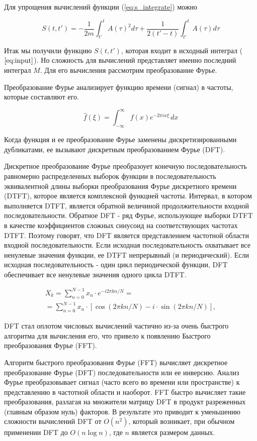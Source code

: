 \documentclass[14pt]{extarticle}
\begin{document}
Для упрощения вычислений функции (\ref{eq:s_integrate}) можно 

\begin{equation}\label{eq:s_integrate2}
S(t, t') = -\frac{1}{2m}\int_{t'}^{t} A(\tau)^2 d\tau + \frac{1}{2(t'-t)} \int_{t'}^{t}A(\tau) d\tau
\end{equation}

Итак мы получили функцию $S(t, t')$, которая входит в исходный интеграл ($\ref{eq:input}$). Но сложность для вычислений представляет именно последний интеграл $M$. Для его вычисления рассмотрим преобразование Фурье.

Преобразование Фурье анализирует функцию времени (сигнал) в частоты, которые составляют его.

$$\hat{f}(\xi) =\int_{-\infty}^{\infty}f(x)e^{-2\pi ix\xi }\,dx$$

Когда функция и ее преобразование Фурье заменены дискретизированными дубликатами, ее вызывают дискретным преобразованием Фурье (DFT). 

Дискретное преобразование Фурье преобразоует конечную последовательность равномерно распределенных выборок функции в последовательность эквивалентной длины выборки преобразования Фурье дискретного времени (DTFT), которое является комплексной функцией частоты. Интервал, в котором выполняется DTFT, является обратной величиной продолжительности входной последовательности. Обратное DFT - ряд Фурье, использующее выборки DTFT в качестве коэффициентов сложных синусоид на соответствующих частотах DTFT. Поэтому говорят, что DFT является представлением частотной области входной последовательности. Если исходная последовательность охватывает все ненулевые значения функции, ее DTFT непрерывный (и периодический). Если исходная последовательность - один цикл периодической функции, DFT обеспечивает все ненулевые значения одного цикла DTFT.

$$\begin{aligned}X_{k}=\sum _{n=0}^{N-1}x_{n}\cdot e^{-i2\pi kn/N}=\\=\sum _{n=0}^{N-1}x_{n}\cdot [\cos(2\pi kn/N)-i\cdot \sin(2\pi kn/N)],\end{aligned}$$	


DFT стал оплотом числовых вычислений частично из-за очень быстрого алгоритма для вычисления его, что привело к появлению Быстрого преобразования Фурье (FFT).

Алгоритм быстрого преобразования Фурье (FFT) вычисляет дискретное преобразование Фурье (DFT) последовательности или ее инверсию. Анализ Фурье преобразовывает сигнал (часто всего во времени или пространстве) к представлению в частотной области и наоборот. FFT быстро вычисляет такие преобразования, разлагая на множители матрицу DFT в продукт разреженных (главным образом нуль) факторов. В результате это приводит к уменьшению сложности вычислений DFT от $ O (n^ {2})$, который возникает, при обычном применении DFT до $O (n\log n)$, где $ n $  является размером данных.
\end{document}
